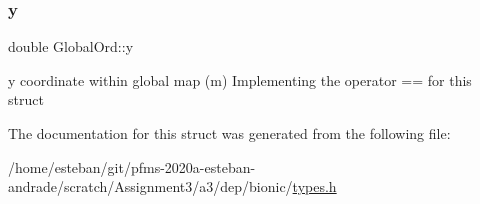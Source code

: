 \subsubsection{\texorpdfstring{y}{y}}
{\footnotesize\ttfamily double Global\+Ord\+::y}

y coordinate within global map (m) Implementing the operator \textquotesingle{}==\textquotesingle{} for this struct 

The documentation for this struct was generated from the following file\+:\begin{DoxyCompactItemize}
\item 
/home/esteban/git/pfms-\/2020a-\/esteban-\/andrade/scratch/\+Assignment3/a3/dep/bionic/\hyperlink{bionic_2types_8h}{types.\+h}\end{DoxyCompactItemize}
